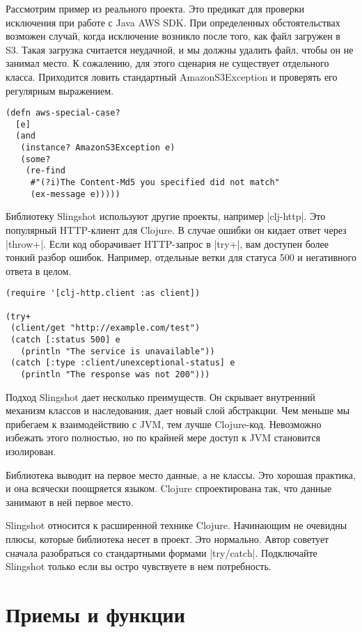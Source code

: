 Рассмотрим пример из реального проекта. Это предикат для проверки исключения при
работе с Java AWS SDK. При определенных обстоятельствах возможен случай, когда
исключение возникло после того, как файл загружен в S3. Такая загрузка считается
неудачной, и мы должны удалить файл, чтобы он не занимал место. К сожалению, для
этого сценария не существует отдельного класса. Приходится ловить стандартный
AmazonS3Exception и проверять его регулярным выражением.

\begin{verbatim}
(defn aws-special-case?
  [e]
  (and
   (instance? AmazonS3Exception e)
   (some?
    (re-find
     #"(?i)The Content-Md5 you specified did not match"
     (ex-message e)))))
\end{verbatim}

Библиотеку Slingshot используют другие проекты, например \spverb|clj-http|. Это
популярный HTTP-клиент для Clojure. В случае ошибки он кидает ответ через
\spverb|throw+|. Если код оборачивает HTTP-запрос в \spverb|try+|, вам доступен более тонкий
разбор ошибок. Например, отдельные ветки для статуса 500 и негативного ответа в
целом.

\begin{verbatim}
(require '[clj-http.client :as client])

(try+
 (client/get "http://example.com/test")
 (catch [:status 500] e
   (println "The service is unavailable"))
 (catch [:type :client/unexceptional-status] e
   (println "The response was not 200")))
\end{verbatim}

Подход Slingshot дает несколько преимуществ. Он скрывает внутренний механизм
классов и наследования, дает новый слой абстракции. Чем меньше мы прибегаем к
взаимодействию с JVM, тем лучше Clojure-код. Невозможно избежать этого
полностью, но по крайней мере доступ к JVM становится изолирован.

Библиотека выводит на первое место данные, а не классы. Это хорошая практика, и
она всячески поощряется языком. Clojure спроектирована так, что данные занимают
в ней первое место.

Slingshot относится к расширенной технике Clojure. Начинающим не очевидны плюсы,
которые библиотека несет в проект. Это нормально. Автор советует сначала
разобраться со стандартными формами \spverb|try/catch|. Подключайте Slingshot только
если вы остро чувствуете в нем потребность.

\section{Приемы и функции}

